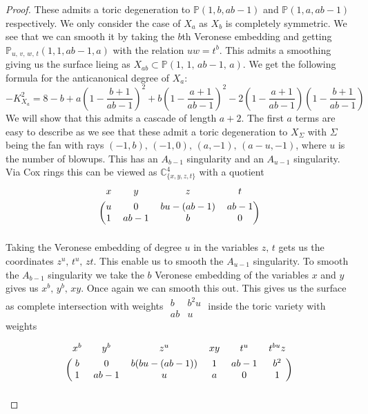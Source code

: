 \documentclass[12pt]{amsbook}
\theoremstyle{plain}
\newcommand{\mb}[1]{\mathbb{#1}}
\begin{document}
\begin{proof}
 These admits a toric degeneration to $\mb{P}(1, b, ab-1)$ and $\mb{P}(1, a, ab-1)$ respectively. We only consider the case of $X_a$ as $X_b$ is completely symmetric. We see that we can smooth it by taking the $b$th Veronese embedding and  getting $\mb{P}_{u,\,v,\,w,\,t}(1, 1, ab-1, a)$ with the relation $uw = t^b$. This admits a smoothing giving us the surface lieing as $X_{ab} \subset \mb{P}(1,\, 1, \, ab-1, \, a)$. We get the following formula for the anticanonical degree of $X_a$:
 \[
 -K_{X_a}^2 =8 - b + a \left( 1- \frac{b+1}{ab-1} \right) ^2 + b \left(1- \frac{a+1}{ab-1} \right)^2 -2\left(1- \frac{a+1}{ab-1}\right)\left(1- \frac{b+1}{ab-1}\right)
\] 
We will show that this admits a cascade of length $a+2$. The first $a$ terms are easy to describe as we see that these admit a toric degeneration to $X_\Sigma$ with $\Sigma$ being the fan with rays $(-1, b), \, (-1, 0), \, (a, -1), \, (a-u, -1)$, where $u$ is the number of blowups. This has an $A_{b-1}$ singularity and an $A_{u-1}$ singularity.
Via Cox rings this can be viewed as $\mb{C}^4_{\{x, y,z,t\}}$ with a quotient 
\[
\begin{blockarray}{cccc}
	x & y & z & t \\[4pt]
      \begin{block}{(cccc)}
		u & 0 & bu - (ab-1) & ab-1 \\
		1 & ab-1 & b & 0 \\
      \end{block}
\end{blockarray}
\]
Taking the Veronese embedding of degree $u$ in the variables $z,\,t$ gets us the coordinates $z^u, \, t^u, \, zt$. This enable us to smooth the $A_{u-1}$ singularity. To smooth the $A_{b-1}$ singularity we take the $b$ Veronese embedding of the variables $x$ and $y$ gives us $x^b, \, y^b, \, xy$. Once again we can smooth this out. This gives us the surface as complete intersection with weights 
$\begin{matrix} b & b^2u \\ ab & u \end{matrix}$
inside the toric variety with weights

\[
\begin{blockarray}{ccc ccc}
	x^b & y^b & z^u & xy & t^u & t^{bu}z \\[4pt]
      \begin{block}{(ccc ccc)}
		b & 0 & b(bu - (ab-1) ) & 1 & ab-1 & b^2\\
		1 & ab-1 & u & a & 0 & 1\\
      \end{block}
\end{blockarray}
\]


\end{proof}
\end{document}
